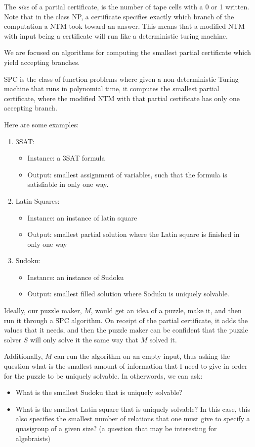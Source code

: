 \documentclass[runningheads,a4paper]{llncs}
\begin{document}
The \emph{size} of a partial certificate, is the number of tape cells with a 0 or 1 written. Note that in the class NP, a certificate specifies exactly which branch of the computation a NTM took toward an answer. This means that a modified NTM with input being a certificate will run like a deterministic turing machine. 

We are focused on algorithms for computing the smallest partial certificate which yield accepting branches.

\begin{definition}
SPC is the class of function problems where given a non-deterministic Turing machine that runs in polynomial time, it computes the smallest partial certificate, where the modified NTM with that partial certificate has only one accepting branch.
\end{definition}

Here are some examples:
\begin{enumerate}
\item 3SAT: \begin{itemize}
	\item Instance: a 3SAT formula
	\item Output: smallest assignment of variables, such that the formula is satisfiable in only one way.
		\end{itemize}
\item Latin Squares: \begin{itemize}
				\item Instance: an instance of latin square
				\item Output: smallest partial solution where the Latin square is finished in only one way
				\end{itemize}
\item Sudoku: \begin{itemize}
				\item Instance: an instance of Sudoku
				\item Output: smallest filled solution where Soduku is uniquely solvable.
\end{itemize}
\end{enumerate}

Ideally, our puzzle maker, $M$, would get an idea of a puzzle, make it, and then run it through a SPC algorithm. On receipt of the partial certificate, it adds the values that it needs, and then the puzzle maker can be confident that the puzzle solver $S$ will only solve it the same way that $M$ solved it.

Additionally, $M$ can run the algorithm on an empty input, thus asking the question what is the smallest amount of information that I need to give in order for the puzzle to be uniquely solvable. In otherwords, we can ask:
\begin{itemize}
\item What is the smallest Sudoku that is uniquely solvable?
\item What is the smallest Latin square that is uniquely solvable? In this case, this also specifies the smallest number of relations that one must give to specify a quasigroup of a given size? (a question that may be interesting for algebraists)
\end{itemize}
\end{document}
